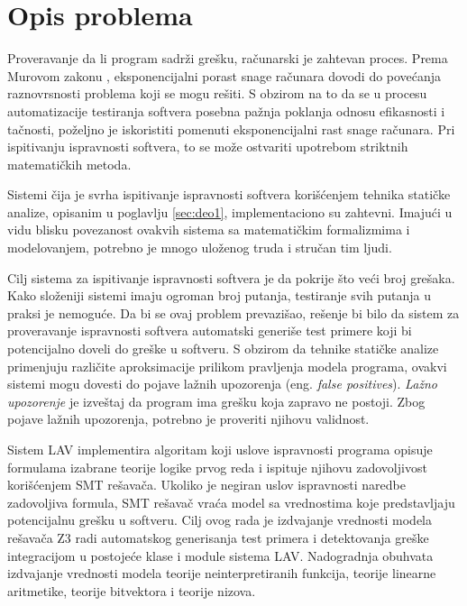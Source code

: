 \documentclass[12pt,oneside]{memoir}
\begin{document}
\section{Opis problema} \label{sec:deo3}
Proveravanje da li program sadrži grešku, računarski je zahtevan proces. Prema Murovom zakonu \cite{Moore}, eksponencijalni porast snage računara dovodi do povećanja raznovrsnosti problema koji se mogu rešiti. 
S obzirom na to da se u procesu automatizacije testiranja softvera posebna pažnja poklanja odnosu efikasnosti i tačnosti, poželjno je iskoristiti pomenuti eksponencijalni rast snage računara. Pri ispitivanju ispravnosti softvera, to se može ostvariti upotrebom striktnih matematičkih metoda.
\par
Sistemi čija je svrha ispitivanje ispravnosti softvera korišćenjem tehnika statičke analize, opisanim u poglavlju \ref{sec:deo1}, implementaciono su zahtevni. Imajući u vidu blisku povezanost ovakvih sistema sa matematičkim formalizmima i modelovanjem, potrebno je mnogo uloženog truda i stručan tim ljudi. 
\par 
Cilj sistema za ispitivanje ispravnosti softvera je da pokrije što veći broj grešaka. Kako složeniji sistemi imaju ogroman broj putanja, testiranje svih putanja u praksi je nemoguće. Da bi se ovaj problem prevazišao, rešenje bi bilo da sistem za proveravanje ispravnosti softvera automatski generiše test primere koji bi potencijalno doveli do greške u softveru. S obzirom da tehnike statičke analize primenjuju različite aproksimacije prilikom pravljenja modela programa, ovakvi sistemi mogu dovesti do pojave lažnih upozorenja (eng. \textit{false positives}). \emph{Lažno upozorenje} je izveštaj da program ima grešku koja zapravo ne postoji. Zbog pojave lažnih upozorenja, potrebno je proveriti njihovu validnost.
\par
Sistem LAV implementira algoritam koji uslove ispravnosti programa opisuje formulama izabrane teorije logike prvog reda i ispituje njihovu zadovoljivost korišćenjem SMT rešavača. Ukoliko je negiran uslov ispravnosti naredbe zadovoljiva formula, SMT rešavač vraća model sa vrednostima koje predstavljaju potencijalnu grešku u softveru. Cilj ovog rada je izdvajanje vrednosti modela rešavača Z3 radi automatskog generisanja test primera i detektovanja greške integracijom u postojeće klase i module sistema LAV. Nadogradnja obuhvata izdvajanje vrednosti modela teorije neinterpretiranih funkcija, teorije linearne aritmetike, teorije bitvektora i teorije nizova.
\end{document}
